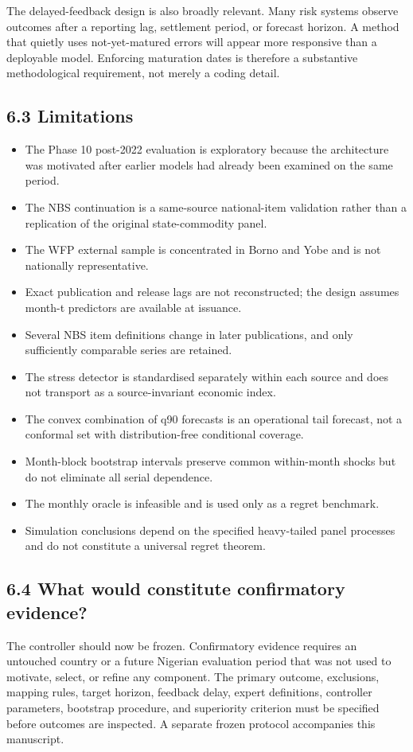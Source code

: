 The delayed-feedback design is also broadly relevant. Many risk systems
observe outcomes after a reporting lag, settlement period, or forecast
horizon. A method that quietly uses not-yet-matured errors will appear
more responsive than a deployable model. Enforcing maturation dates is
therefore a substantive methodological requirement, not merely a coding
detail.

\subsection{6.3 Limitations}\label{limitations}

\begin{itemize}
\item
  The Phase 10 post-2022 evaluation is exploratory because the
  architecture was motivated after earlier models had already been
  examined on the same period.
\item
  The NBS continuation is a same-source national-item validation rather
  than a replication of the original state-commodity panel.
\item
  The WFP external sample is concentrated in Borno and Yobe and is not
  nationally representative.
\item
  Exact publication and release lags are not reconstructed; the design
  assumes month-t predictors are available at issuance.
\item
  Several NBS item definitions change in later publications, and only
  sufficiently comparable series are retained.
\item
  The stress detector is standardised separately within each source and
  does not transport as a source-invariant economic index.
\item
  The convex combination of q90 forecasts is an operational tail
  forecast, not a conformal set with distribution-free conditional
  coverage.
\item
  Month-block bootstrap intervals preserve common within-month shocks
  but do not eliminate all serial dependence.
\item
  The monthly oracle is infeasible and is used only as a regret
  benchmark.
\item
  Simulation conclusions depend on the specified heavy-tailed panel
  processes and do not constitute a universal regret theorem.
\end{itemize}

\subsection{6.4 What would constitute confirmatory
evidence?}\label{what-would-constitute-confirmatory-evidence}

The controller should now be frozen. Confirmatory evidence requires an
untouched country or a future Nigerian evaluation period that was not
used to motivate, select, or refine any component. The primary outcome,
exclusions, mapping rules, target horizon, feedback delay, expert
definitions, controller parameters, bootstrap procedure, and superiority
criterion must be specified before outcomes are inspected. A separate
frozen protocol accompanies this manuscript.
